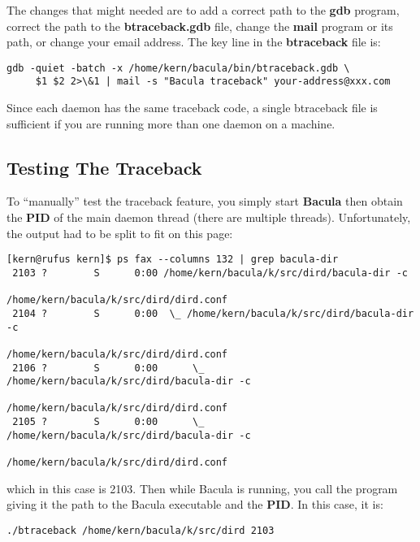 The changes that might needed are to add a correct path to the {\bf gdb}
program, correct the path to the {\bf btraceback.gdb} file, change the {\bf
mail} program or its path, or change your email address. The key line in the
{\bf btraceback} file is: 

\footnotesize
\begin{verbatim}
gdb -quiet -batch -x /home/kern/bacula/bin/btraceback.gdb \
     $1 $2 2>\&1 | mail -s "Bacula traceback" your-address@xxx.com
\end{verbatim}
\normalsize

Since each daemon has the same traceback code, a single btraceback file is
sufficient if you are running more than one daemon on a machine. 

\subsection*{Testing The Traceback}

To ``manually'' test the traceback feature, you simply start {\bf Bacula} then
obtain the {\bf PID} of the main daemon thread (there are multiple threads).
Unfortunately, the output had to be split to fit on this page: 

\footnotesize
\begin{verbatim}
[kern@rufus kern]$ ps fax --columns 132 | grep bacula-dir
 2103 ?        S      0:00 /home/kern/bacula/k/src/dird/bacula-dir -c
                                       /home/kern/bacula/k/src/dird/dird.conf
 2104 ?        S      0:00  \_ /home/kern/bacula/k/src/dird/bacula-dir -c
                                       /home/kern/bacula/k/src/dird/dird.conf
 2106 ?        S      0:00      \_ /home/kern/bacula/k/src/dird/bacula-dir -c
                                       /home/kern/bacula/k/src/dird/dird.conf
 2105 ?        S      0:00      \_ /home/kern/bacula/k/src/dird/bacula-dir -c
                                       /home/kern/bacula/k/src/dird/dird.conf
\end{verbatim}
\normalsize

which in this case is 2103. Then while Bacula is running, you call the program
giving it the path to the Bacula executable and the {\bf PID}. In this case,
it is: 

\footnotesize
\begin{verbatim}
./btraceback /home/kern/bacula/k/src/dird 2103
\end{verbatim}
\normalsize

